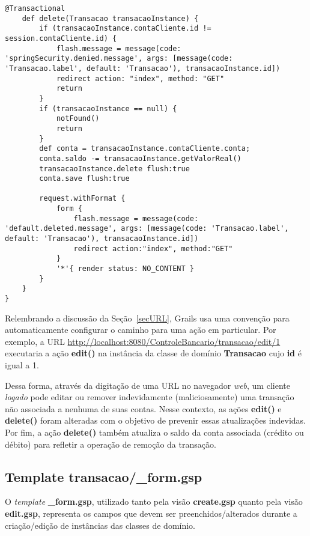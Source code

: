 \begin{lstlisting}[caption=Controlador  {\bf  TransacaoController},  frame=trBL,
    float=htbp, label=codTransacaoController3]
    @Transactional
    def delete(Transacao transacaoInstance) {                
        if (transacaoInstance.contaCliente.id != session.contaCliente.id) {
            flash.message = message(code: 'springSecurity.denied.message', args: [message(code: 'Transacao.label', default: 'Transacao'), transacaoInstance.id])
            redirect action: "index", method: "GET"
            return
        }
        if (transacaoInstance == null) {
            notFound()
            return
        }
        def conta = transacaoInstance.contaCliente.conta;
        conta.saldo -= transacaoInstance.getValorReal()
        transacaoInstance.delete flush:true
        conta.save flush:true

        request.withFormat {
            form {
                flash.message = message(code: 'default.deleted.message', args: [message(code: 'Transacao.label', default: 'Transacao'), transacaoInstance.id])
                redirect action:"index", method:"GET"
            }
            '*'{ render status: NO_CONTENT }
        }
    }
}
\end{lstlisting}

\newpage

Relembrando  a discussão da  Seção~\ref{secURL}, Grails  usa uma  convenção para
automaticamente configurar o caminho para uma ação em particular. Por exemplo, a
URL  \url{http://localhost:8080/ControleBancario/transacao/edit/1}  executaria a
ação {\bf  edit()} na instância da  classe de domínio {\bf  Transacao} cujo {\bf
  id} é igual a 1. 

Dessa forma, através da digitação de  uma URL no navegador {\it web}, um cliente
{\it logado} pode editar ou remover indevidamente (maliciosamente) uma transação
não associada a nenhuma de suas  contas. Nesse contexto, as ações {\bf edit()} e
{\bf delete()}  foram alteradas  com o objetivo  de prevenir  essas atualizações
indevidas.  Por  fim, a  ação {\bf  delete()} também atualiza  o saldo  da conta
associada (crédito ou débito) para refletir a operação de remoção da transação.

\subsection{Template transacao/\_form.gsp}

\vspace{0.5cm}

O {\it template}  {\bf \_form.gsp}, utilizado tanto pela  visão {\bf create.gsp}
quanto  pela  visão   {\bf  edit.gsp},  representa  os  campos   que  devem  ser
preenchidos/alterados  durante a  criação/edição  de instâncias  das classes  de
domínio. 

